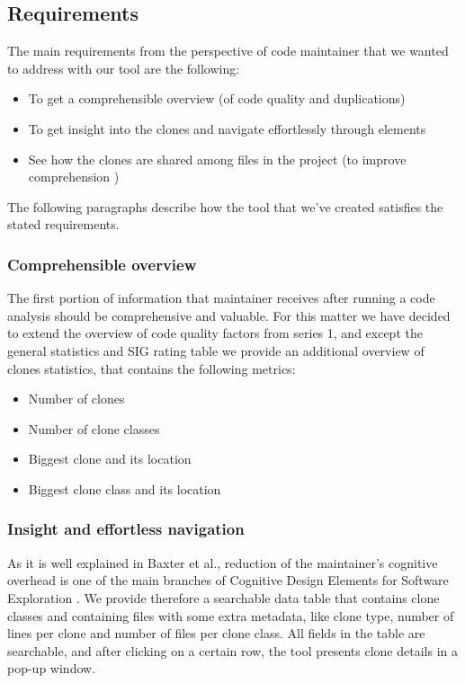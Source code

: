 \documentclass{uva-inf-article}
\begin{document}
\subsection{Requirements}
The main requirements from the perspective of code maintainer that we wanted to address with our tool are the following: 

\begin{itemize}
    \item{To get a comprehensible overview (of code quality and duplications)}
    \item{To get insight into the clones and navigate effortlessly through elements}
    \item{See how the clones are shared among files in the project (to improve comprehension ) }
\end{itemize}

The following paragraphs describe how the tool that we've created satisfies the stated requirements. 

\subsubsection{Comprehensible overview}
The first portion of information that maintainer receives after running a code analysis should be comprehensive and valuable. For this matter we have decided to extend the overview of code quality factors from series 1, and except the general statistics and SIG rating table we provide an additional overview of clones statistics, that contains the following metrics: 
\begin{itemize}
	\item{Number of clones}
	\item{Number of clone classes}
	\item{Biggest clone and its location}
	\item{Biggest clone class and its location}
\end{itemize}

\subsubsection{Insight and effortless navigation}
As it is well explained in Baxter et al., reduction of the maintainer's cognitive overhead is one of the main branches of Cognitive Design Elements for Software Exploration \cite{baxter1998clone}. We provide therefore a searchable data table that contains clone classes and containing files with some extra metadata, like clone type, number of lines per clone and number of files per clone class. All fields in the table are searchable, and after clicking on a certain row, the tool presents clone details in a pop-up window. 
\end{document}
